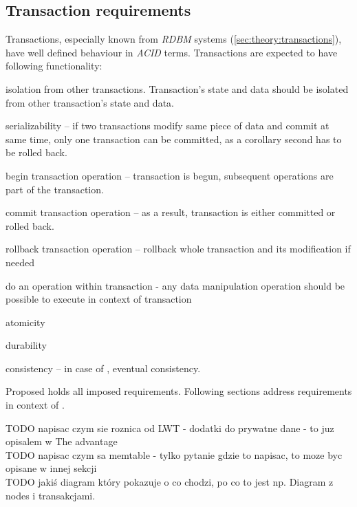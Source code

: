 \subsection{Transaction requirements}
Transactions, especially known from \emph{RDBM} systems (\ref{sec:theory:transactions}), have well defined behaviour in \emph{ACID} terms. Transactions are expected to have following functionality:
\begin{enumerate*}
\item isolation from other transactions. Transaction's state and data should be isolated from other transaction's state and data.
\item serializability -- if two transactions modify same piece of data and commit at same time, only one transaction can be committed, as a corollary second has to be rolled back.
\item begin transaction operation -- transaction is begun, subsequent operations are part of the transaction. 
\item commit transaction operation -- as a result, transaction is either committed or rolled back.
\item rollback transaction operation -- rollback whole transaction and its modification if needed
\item do an operation within transaction - any data manipulation operation should be possible to execute in context of transaction
\item atomicity
\item durability
\item consistency -- in case of \mpp, eventual consistency.
\end{enumerate*}

Proposed \mpp holds all imposed requirements. Following sections address requirements in context of \mpp.

TODO napisac czym sie roznica od LWT - dodatki do prywatne dane - to juz opisalem w The advantage \\
TODO napisac czym sa memtable - tylko pytanie gdzie to napisac, to moze byc opisane w innej sekcji \\






TODO jakiś diagram który pokazuje o co chodzi, po co to jest np. Diagram z nodes i transakcjami.
